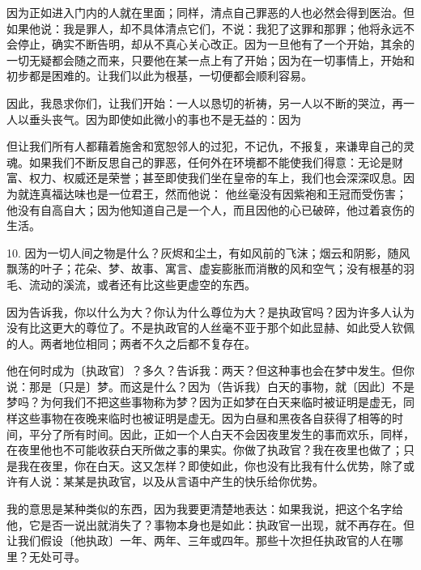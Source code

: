 因为正如进入门内的人就在里面；同样，清点自己罪恶的人也必然会得到医治。但如果他说：我是罪人，却不具体清点它们，不说：我犯了这罪和那罪；他将永远不会停止，确实不断告明，却从不真心关心改正。因为一旦他有了一个开始，其余的一切无疑都会随之而来，只要他在某一点上有了开始；因为在一切事情上，开始和初步都是困难的。让我们以此为根基，一切便都会顺利容易。\par

因此，我恳求你们，让我们开始：一人以恳切的祈祷，另一人以不断的哭泣，再一人以垂头丧气。因为即使如此微小的事也不是无益的：因为\par

但让我们所有人都藉着施舍和宽恕邻人的过犯，不记仇，不报复，来谦卑自己的灵魂。如果我们不断反思自己的罪恶，任何外在环境都不能使我们得意：无论是财富、权力、权威还是荣誉；甚至即使我们坐在皇帝的车上，我们也会深深叹息。因为就连真福达味也是一位君王，然而他说： 他丝毫没有因紫袍和王冠而受伤害；他没有自高自大；因为他知道自己是一个人，而且因他的心已破碎，他过着哀伤的生活。\par

10. 因为一切人间之物是什么？灰烬和尘土，有如风前的飞沫；烟云和阴影，随风飘荡的叶子；花朵、梦、故事、寓言、虚妄膨胀而消散的风和空气；没有根基的羽毛、流动的溪流，或者还有比这些更虚空的东西。\par

因为告诉我，你以什么为大？你认为什么尊位为大？是执政官吗？因为许多人认为没有比这更大的尊位了。不是执政官的人丝毫不亚于那个如此显赫、如此受人钦佩的人。两者地位相同；两者不久之后都不复存在。\par

他在何时成为〔执政官〕？多久？告诉我：两天？但这种事也会在梦中发生。但你说：那是〔只是〕梦。而这是什么？因为（告诉我）白天的事物，就〔因此〕不是梦吗？为何我们不把这些事物称为梦？因为正如梦在白天来临时被证明是虚无，同样这些事物在夜晚来临时也被证明是虚无。因为白昼和黑夜各自获得了相等的时间，平分了所有时间。因此，正如一个人白天不会因夜里发生的事而欢乐，同样，在夜里他也不可能收获白天所做之事的果实。你做了执政官？我在夜里也做了；只是我在夜里，你在白天。这又怎样？即使如此，你也没有比我有什么优势，除了或许有人说：某某是执政官，以及从言语中产生的快乐给你优势。\par

我的意思是某种类似的东西，因为我要更清楚地表达：如果我说，把这个名字给他，它是否一说出就消失了？事物本身也是如此：执政官一出现，就不再存在。但让我们假设〔他执政〕一年、两年、三年或四年。那些十次担任执政官的人在哪里？无处可寻。\par

